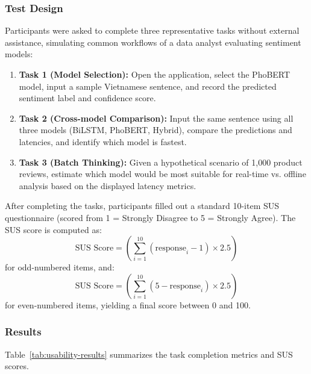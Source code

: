 \documentclass[12pt]{report} %
\begin{document}
\subsubsection{Test Design}

Participants were asked to complete three representative tasks without external assistance, simulating common workflows of a data analyst evaluating sentiment models:
\begin{enumerate}
    \item \textbf{Task 1 (Model Selection):} Open the application, select the PhoBERT model, input a sample Vietnamese sentence, and record the predicted sentiment label and confidence score.
    \item \textbf{Task 2 (Cross-model Comparison):} Input the same sentence using all three models (BiLSTM, PhoBERT, Hybrid), compare the predictions and latencies, and identify which model is fastest.
    \item \textbf{Task 3 (Batch Thinking):} Given a hypothetical scenario of 1,000 product reviews, estimate which model would be most suitable for real-time vs. offline analysis based on the displayed latency metrics.
\end{enumerate}

After completing the tasks, participants filled out a standard 10-item SUS questionnaire (scored from 1 = Strongly Disagree to 5 = Strongly Agree). The SUS score is computed as:
\[
    \text{SUS Score} = \left( \sum_{i=1}^{10} (\text{response}_i - 1) \times 2.5 \right)
\]
for odd-numbered items, and:
\[
    \text{SUS Score} = \left( \sum_{i=1}^{10} (5 - \text{response}_i) \times 2.5 \right)
\]
for even-numbered items, yielding a final score between 0 and 100.

\subsubsection{Results}

Table~\ref{tab:usability-results} summarizes the task completion metrics and SUS scores.
\end{document}
